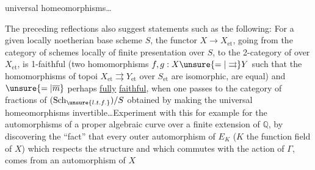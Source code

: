 universal homeomorphisms\ldots

The preceding reflections also suggest statements such as the following: For a given locally noetherian base scheme $S$, the functor $X\longrightarrow X_{\mathrm{et}}$, going from the category  of schemes locally of finite presentation over $S$, to the 2-category of  over $X_{\mathrm{et}}$, is  1-faithful (two homomorphisms $f,g:X\unsure{=|\rightrightarrows}Y$ such that the homomorphisms of topoi $X_{\mathrm{et}}\rightrightarrows Y_{\mathrm{et}}$ over $S_{\mathrm{et}}$ are  isomorphic, are equal) and $\unsure{=|\overline m}$ perhaps \uline{fully} \uline{faithful}, when one passes to the category of fractions of $(\mathrm{Sch}_{\unsure{l.t.f.}})/S$ obtained by making the universal homeomorphisms invertible\ldots Experiment with  this for example for the automorphisms of a proper algebraic curve over a finite extension of $\mathbb{Q}$, by discovering the ``fact'' that every outer automorphism of $E_K$ ($K$ the function field of $X$) which respects the  structure and which commutes with the action of $\Gamma$, comes from an automorphism of $X$
